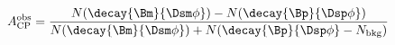 







\begin{equation}
  A_\mathrm{CP}^\mathrm{obs} =
  \frac{
    N(\decay{\Bm}{\Dsm\phi}) - N(\decay{\Bp}{\Dsp\phi})
  }{
    N(\decay{\Bm}{\Dsm\phi}) + N(\decay{\Bp}{\Dsp\phi} - N_\mathrm{bkg})
  }
\end{equation}
